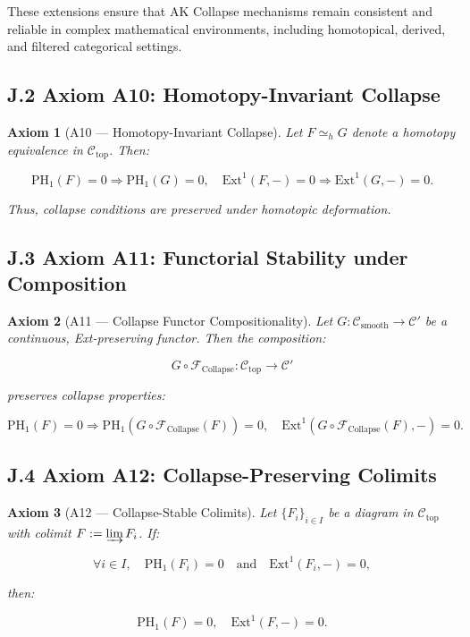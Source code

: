 \documentclass[11pt]{article}
\newtheorem{axiom}{Axiom}[section]
\begin{document}
These extensions ensure that AK Collapse mechanisms remain consistent and reliable in complex mathematical environments, including homotopical, derived, and filtered categorical settings.

\subsection*{J.2 Axiom A10: Homotopy-Invariant Collapse}

\begin{axiom}[A10 — Homotopy-Invariant Collapse]
Let \( F \simeq_h G \) denote a homotopy equivalence in \( \mathcal{C}_{\mathrm{top}} \). Then:

\[
\mathrm{PH}_1(F) = 0 \Rightarrow \mathrm{PH}_1(G) = 0,
\quad \mathrm{Ext}^1(F, -) = 0 \Rightarrow \mathrm{Ext}^1(G, -) = 0.
\]

Thus, collapse conditions are preserved under homotopic deformation.
\end{axiom}

\subsection*{J.3 Axiom A11: Functorial Stability under Composition}

\begin{axiom}[A11 — Collapse Functor Compositionality]
Let \( G : \mathcal{C}_{\mathrm{smooth}} \to \mathcal{C}' \) be a continuous, Ext-preserving functor. Then the composition:

\[
G \circ \mathcal{F}_{\mathrm{Collapse}} : \mathcal{C}_{\mathrm{top}} \to \mathcal{C}'
\]

preserves collapse properties:

\[
\mathrm{PH}_1(F) = 0 \Rightarrow \mathrm{PH}_1(G \circ \mathcal{F}_{\mathrm{Collapse}}(F)) = 0,
\quad \mathrm{Ext}^1(G \circ \mathcal{F}_{\mathrm{Collapse}}(F), -) = 0.
\]
\end{axiom}

\subsection*{J.4 Axiom A12: Collapse-Preserving Colimits}

\begin{axiom}[A12 — Collapse-Stable Colimits]
Let \( \{ F_i \}_{i \in I} \) be a diagram in \( \mathcal{C}_{\mathrm{top}} \) with colimit \( F := \varinjlim F_i \). If:

\[
\forall i \in I, \quad \mathrm{PH}_1(F_i) = 0 \quad \text{and} \quad \mathrm{Ext}^1(F_i, -) = 0,
\]

then:

\[
\mathrm{PH}_1(F) = 0, \quad \mathrm{Ext}^1(F, -) = 0.
\]
\end{axiom}
\end{document}
